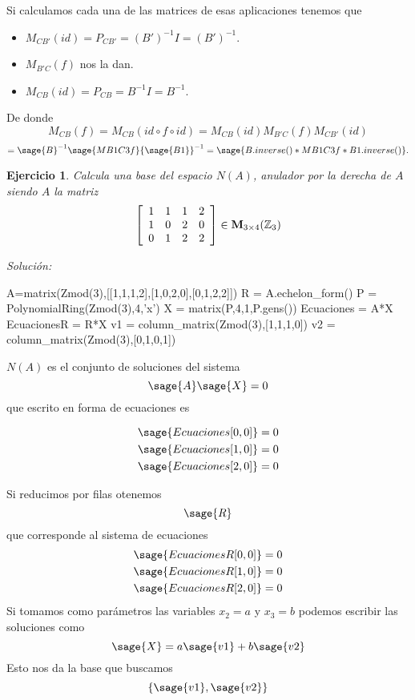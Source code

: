 \documentclass{amsart}
\newtheorem{ejer}{Ejercicio}
\begin{document}
Si calculamos cada una de las matrices de esas aplicaciones tenemos que
\begin{itemize}
\item $M_{CB'}(id) = P_{CB'} = (B')^{-1}I = (B')^{-1}$.
\item $M_{B'C}(f)$ nos la dan.
\item $M_{CB}(id) = P_{CB} = B^{-1}I= B^{-1}$. 
\end{itemize}

De donde 
\[ M_{CB}(f) = M_{CB}(id\circ f\circ id) =  M_{CB}(id) M_{B'C}(f) M_{CB'}(id) \] 
\[ = {\sage{B}}^{-1}\sage{MB1C3f}{\sage{B1}}^{-1} = \sage{B.inverse()*MB1C3f*B1.inverse()}. \]



\begin{ejer} Calcula una base del espacio $N(A)$, anulador por la derecha de $A$ siendo $A$ la matriz
\[ \left[\begin{array}{rrrr}
1 & 1 & 1 & 2 \\
1 & 0 & 2 & 0 \\
0 & 1 & 2 & 2 
\end{array}\right] \in {\bf M}_{3 \times 4}({\mathbb Z}_{3})\]
\end{ejer}

{\it Soluci\'on:}
\begin{sageblock}
A=matrix(Zmod(3),[[1,1,1,2],[1,0,2,0],[0,1,2,2]])
R = A.echelon_form()
P = PolynomialRing(Zmod(3),4,'x')
X = matrix(P,4,1,P.gens())
Ecuaciones = A*X
EcuacionesR = R*X
v1 = column_matrix(Zmod(3),[1,1,1,0])
v2 = column_matrix(Zmod(3),[0,1,0,1])
\end{sageblock}

$N(A)$ es el conjunto de soluciones del sistema
$$ \sage{A} \sage{X} = 0 $$
que escrito en forma de ecuaciones es

\begin{align*}
\sage{Ecuaciones[0,0]} &= 0 \\
\sage{Ecuaciones[1,0]} &= 0 \\
\sage{Ecuaciones[2,0]} &= 0 \\
\end{align*}

Si reducimos por filas otenemos 
$$ \sage{R}$$
que corresponde al sistema de ecuaciones
\begin{align*}
\sage{EcuacionesR[0,0]} &= 0 \\
\sage{EcuacionesR[1,0]} &= 0 \\
\sage{EcuacionesR[2,0]} &= 0 \\
\end{align*}
Si tomamos como parámetros las variables $x_2 = a$ y $x_3 = b$ podemos
escribir las soluciones como 
$$ \sage{X} = a \sage{v1} + b \sage{v2} $$
Esto nos da la base que buscamos 
$$ \left\{ \sage{v1}, \sage{v2} \right\} $$
\end{document}
